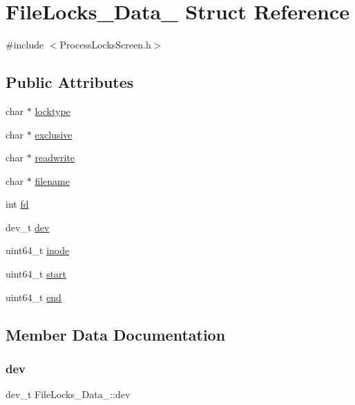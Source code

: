 \hypertarget{structFileLocks__Data__}{}\section{File\+Locks\+\_\+\+Data\+\_\+ Struct Reference}
\label{structFileLocks__Data__}


{\ttfamily \#include $<$Process\+Locks\+Screen.\+h$>$}

\subsection*{Public Attributes}
\begin{DoxyCompactItemize}
\item 
char $\ast$ \hyperlink{structFileLocks__Data___adc254f1ff14f8b12d64c076e4d6e9b30}{locktype}
\item 
char $\ast$ \hyperlink{structFileLocks__Data___a4c855b8a703f39d6a796389bc4bd11ac}{exclusive}
\item 
char $\ast$ \hyperlink{structFileLocks__Data___ab28fd39dfc3bb9303128f268596deb1e}{readwrite}
\item 
char $\ast$ \hyperlink{structFileLocks__Data___a9522229c73da0782d25a0212273c2528}{filename}
\item 
int \hyperlink{structFileLocks__Data___a58594f68d05363e699c3788e1c3ad3aa}{fd}
\item 
dev\+\_\+t \hyperlink{structFileLocks__Data___a7d2e31ca77cd91969e0fc84d0910947d}{dev}
\item 
uint64\+\_\+t \hyperlink{structFileLocks__Data___ab3cfd6d6332a7dfdafffe9d439153fbc}{inode}
\item 
uint64\+\_\+t \hyperlink{structFileLocks__Data___a1787f9d2a386a760875da57611b88ddf}{start}
\item 
uint64\+\_\+t \hyperlink{structFileLocks__Data___aca69cf9d5ecfc42f93f33c64f9a6f5c7}{end}
\end{DoxyCompactItemize}


\subsection{Member Data Documentation}
\mbox{\label{structFileLocks__Data___a7d2e31ca77cd91969e0fc84d0910947d}} 
\subsubsection{\texorpdfstring{dev}{dev}}
{\footnotesize\ttfamily dev\+\_\+t File\+Locks\+\_\+\+Data\+\_\+\+::dev}

